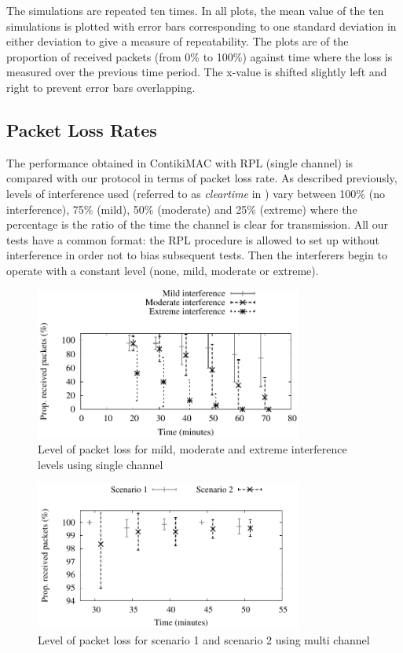 
The simulations are repeated ten times. In all plots, the mean value of the ten simulations is plotted with error bars corresponding to one standard deviation in either deviation to give a measure of repeatability. The plots are of the proportion of received packets (from 0\% to 100\%) against time where the loss is measured over the previous time period.  The x-value is shifted slightly left and right to prevent error bars overlapping.

\subsection{Packet Loss Rates}
The performance obtained in ContikiMAC with RPL (single channel) is compared with our protocol in terms of packet loss rate.
As described previously, levels of interference used (referred to as \emph{clear\textunderscore time} in \cite{interferenceModel})
vary between 100\% (no interference), 75\% (mild), 50\% (moderate) and 25\% (extreme) where the percentage is the ratio of the time the channel is clear for transmission.  All our tests have a common format: the RPL procedure is allowed to set up without interference in order not to bias subsequent tests.
Then the interferers begin to operate with a constant level (none, mild, moderate or extreme).

\begin{figure}
\centering
\includegraphics[width=0.78\textwidth]{single_channel.pdf}
\caption{Level of packet loss for mild, moderate and extreme interference levels using single channel}
\label{fig:interference}
\end{figure}

\begin{figure}
\centering
\includegraphics[width=0.78\textwidth]{multi_channel.pdf}
\caption{Level of packet loss for scenario 1 and scenario 2 using multi channel}
\label{fig:multi_interference}
\end{figure}

